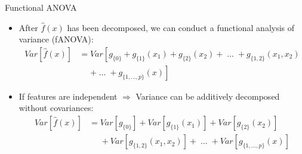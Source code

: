 \documentclass[11pt,compress,t,notes=noshow, aspectratio=169, xcolor=table]{beamer}
\begin{document}



\begin{frame}{Functional ANOVA}

\begin{itemize}
\item After $\hat{f}(x)$ has been decomposed, we can conduct a functional analysis of variance (fANOVA):
\begin{align*}
Var\left[\hat{f}(x)\right] &= Var\left[g_{\{0\}} + g_{\{1\}}(x_1) + g_{\{2\}}(x_2) + \;\dots\; + g_{\{1, 2\}}(x_1, x_2) \right. \\
&\phantom{{}={}} \left. + \;\dots\; + g_{\{1,\ldots,p\}}(x) \right]
\end{align*}
\item If features are independent $\Rightarrow$ Variance can be additively decomposed without covariances:
\begin{align*}
Var\left[\hat{f}(x)\right] &= Var\left[g_{\{0\}}\right] + Var\left[g_{\{1\}}(x_1)\right] + Var\left[g_{\{2\}}(x_2)\right] \\
&\phantom{{}={}} + Var\left[g_{\{1, 2\}}(x_1, x_2)\right] + \;\dots\; + Var\left[g_{\{1,\ldots,p\}}(x)\right]
\end{align*}
\end{itemize}
\end{frame}
\end{document}
